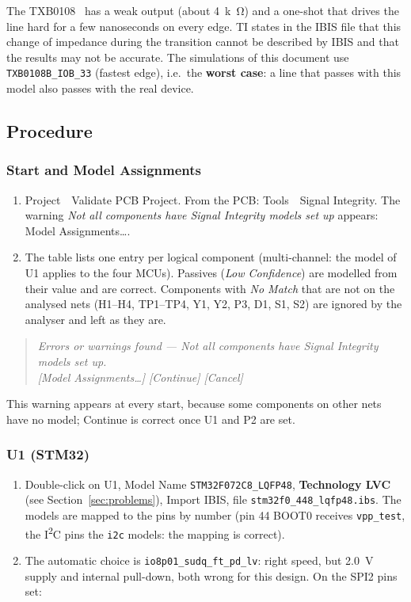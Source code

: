 \documentclass[11pt,a4paper]{article}
\newcommand{\gui}[1]{\textsf{#1}}
\newcommand{\m}{\,\guillemotright\ }
\newenvironment{dialog}{\begin{quote}\small\itshape}{\end{quote}}
\begin{document}
The TXB0108~\cite{txbds} has a weak output (about \qty{4}{k\ohm}) and a one-shot that drives the line hard
for a few nanoseconds on every edge. TI states in the IBIS file that this change of impedance
during the transition cannot be described by IBIS and that the results may not be accurate. The
simulations of this document use \texttt{TXB0108B\_IOB\_33} (fastest edge), i.e.\ the \textbf{worst case}: a line
that passes with this model also passes with the real device.

\subsection{Procedure}

\subsubsection{Start and Model Assignments}

\begin{enumerate}
    \item \gui{Project \m Validate PCB Project}. From the PCB: \gui{Tools \m Signal Integrity}. The warning \textit{Not
    all components have Signal Integrity models set up} appears: \gui{Model Assignments\dots}.
    \item The table lists one entry per logical component (multi-channel: the model of U1 applies to
    the four MCUs). Passives (\textit{Low Confidence}) are modelled from their value and are correct.
    Components with \textit{No Match} that are not on the analysed nets (H1--H4, TP1--TP4, Y1, Y2,
    P3, D1, S1, S2) are ignored by the analyser and left as they are.
\end{enumerate}

\begin{dialog}
Errors or warnings found --- Not all components have Signal Integrity models set up.\\
\upshape\gui{[Model Assignments\dots] [Continue] [Cancel]}
\end{dialog}

\noindent This warning appears at every start, because some components on other nets have no model;
\gui{Continue} is correct once U1 and P2 are set.

\subsubsection{U1 (STM32)}

\begin{enumerate}
    \item Double-click on U1, Model Name \texttt{STM32F072C8\_LQFP48}, \textbf{Technology LVC} (see Section~\ref{sec:problems}),
    \gui{Import IBIS}, file \texttt{stm32f0\_448\_lqfp48.ibs}. The models are mapped to the pins
    by number (pin 44 BOOT0 receives \texttt{vpp\_test}, the I\textsuperscript{2}C pins the \texttt{i2c} models: the mapping
    is correct).
    \item The automatic choice is \texttt{io8p01\_sudq\_ft\_pd\_lv}: right speed, but \qty{2.0}{V} supply and internal
    pull-down, both wrong for this design. On the SPI2 pins set:
\end{enumerate}
\end{document}
